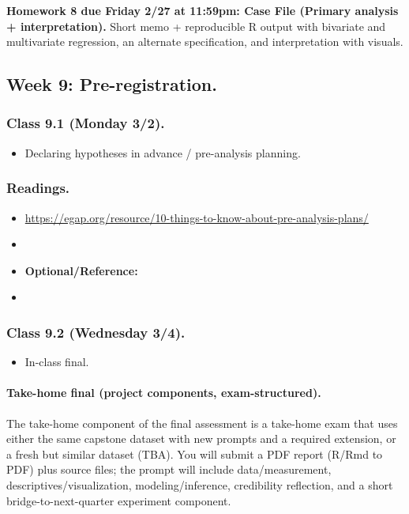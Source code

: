 \documentclass[letterpaper, 12pt, parskip=full,DIV=10]{scrartcl}
\begin{document}
\textbf{Homework 8 due Friday 2/27 at 11:59pm: Case File (Primary analysis + interpretation).}
Short memo + reproducible R output with bivariate and multivariate regression, an alternate specification, and interpretation with visuals.

\subsection*{Week 9: Pre-registration.}
\subsubsection*{Class 9.1 (Monday 3/2).}
\begin{itemize}
\item Declaring hypotheses in advance / pre-analysis planning.
\end{itemize}

\subsubsection*{Readings.}
\begin{itemize}
\item {} \url{https://egap.org/resource/10-things-to-know-about-pre-analysis-plans/}
\item {}
\item \textbf{Optional/Reference:} \item {}
\end{itemize}

\subsubsection*{Class 9.2 (Wednesday 3/4).}
\begin{itemize}
\item In-class final.
\end{itemize}

\paragraph{Take-home final (project components, exam-structured).}
The take-home component of the final assessment is a take-home exam that uses either the same capstone dataset with new prompts and a required extension, or a fresh but similar dataset (TBA).
You will submit a PDF report (R/Rmd to PDF) plus source files; the prompt will include data/measurement, descriptives/visualization, modeling/inference, credibility reflection, and a short bridge-to-next-quarter experiment component.
\end{document}

